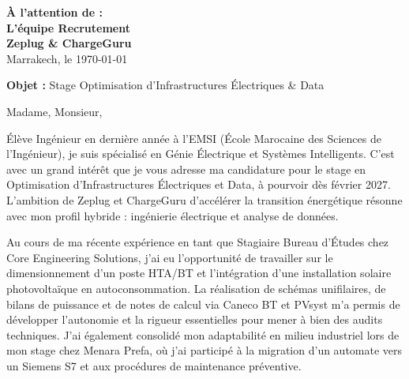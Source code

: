 \documentclass[10pt,a4paper]{../../altacv}
\makeatletter
\renewcommand{\makecvheader}{%
  \begingroup
    \raggedright\color{emphasis}%
    {\Huge\bfseries\MakeUppercase{\@name}\par}
    \medskip
    {\large\bfseries\color{accent}\@tagline\par}
    \medskip
    {\footnotesize\bfseries\@personalinfo\par}
  \endgroup\medskip
}
\makeatother
\begin{document}

\makecvheader

\bigskip
\medskip

\begin{flushright}
  {\color{emphasis}\textbf{À l'attention de :}} \\[2pt]
  \textbf{L'équipe Recrutement} \\
  \textbf{Zeplug \& ChargeGuru} \\[20pt]
  Marrakech, le \today
\end{flushright}
\bigskip

\bigskip

{\color{accent}\textbf{Objet :}} Stage Optimisation d’Infrastructures Électriques \& Data
\bigskip\bigskip

Madame, Monsieur,

\vspace{0.4cm}

Élève Ingénieur en dernière année à l'EMSI (École Marocaine des Sciences de l'Ingénieur), je suis spécialisé en Génie Électrique et Systèmes Intelligents. C'est avec un grand intérêt que je vous adresse ma candidature pour le stage en Optimisation d'Infrastructures Électriques et Data, à pourvoir dès février 2027. L'ambition de Zeplug et ChargeGuru d'accélérer la transition énergétique résonne avec mon profil hybride : ingénierie électrique et analyse de données.

\vspace{0.4cm}

Au cours de ma récente expérience en tant que Stagiaire Bureau d'Études chez Core Engineering Solutions, j'ai eu l'opportunité de travailler sur le dimensionnement d'un poste HTA/BT et l'intégration d'une installation solaire photovoltaïque en autoconsommation. La réalisation de schémas unifilaires, de bilans de puissance et de notes de calcul via Caneco BT et PVsyst m'a permis de développer l'autonomie et la rigueur essentielles pour mener à bien des audits techniques. J'ai également consolidé mon adaptabilité en milieu industriel lors de mon stage chez Menara Prefa, où j'ai participé à la migration d'un automate vers un Siemens S7 et aux procédures de maintenance préventive.
\end{document}
